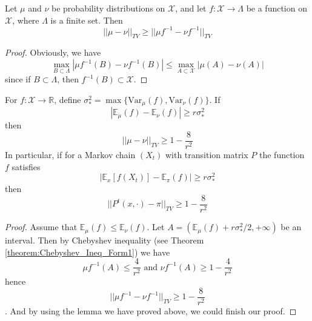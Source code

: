 \begin{lemma}
  Let $\mu$ and $\nu$ be probability distributions on $\mathcal{X}$, and let $f: \mathcal{X} \to \Lambda$ be a function on $\mathcal{X}$, where $\Lambda$ is a finite set. Then
  \[||\mu - \nu||_{TV} \geq ||\mu f^{-1} - \nu f^{-1}||_{TV}\]
\end{lemma}
\begin{proof}
  Obviously, we have
  \[\max_{B\subset\Lambda} |\mu f^{-1}(B) - \nu f^{-1}(B)| \leq \max_{A\subset\mathcal{X}} |\mu(A) - \nu(A)|\]
  since if $B\subset\Lambda$, then $f^{-1}(B)\subset\mathcal{X}$.
\end{proof}

\begin{theorem}
  For $f:\mathcal{X} \to \mathbb{R}$, define $\sigma_*^2 = \max\{\mathrm{Var}_\mu(f), \mathrm{Var}_\nu(f)\}$.
  If
  \[|\mathbb{E}_\mu(f) - \mathbb{E}_\nu(f)|\geq r\sigma_*^2\]
  then
  \[||\mu-\nu||_{TV}\geq 1 - \frac{8}{r^2}\]
  \tcblower
  In particular, if for a Markov chain $(X_t)$ with transition matrix $P$ the function $f$ satisfies
  \[|\mathbb{E}_x[f(X_t)] - \mathbb{E}_\pi(f)| \geq r\sigma_*^2\]
  then
  \[||P^t(x, \cdot) - \pi||_{TV}\geq 1-\frac{8}{r^2}\]
\end{theorem}
\begin{proof}
  Assume that $\mathbb{E}_\mu(f) \leq \mathbb{E}_\nu(f)$.
  Let $A = (\mathbb{E}_\mu(f) + r\sigma_*^2/2, +\infty)$ be an interval.
  Then by Chebyshev inequality (see Theorem \ref{theorem:Chebyshev_Ineq_Form1}) we have
  \[\mbox{$\mu f^{-1}(A) \leq \frac{4}{r^2}$ and $\nu f^{-1} (A) \geq 1 - \frac{4}{r^2}$}\]
  hence
  \[||\mu f^{-1} - \nu f^{-1}||_{TV} \geq 1 - \frac{8}{r^2}\].
  And by using the lemma we have proved above, we could finish our proof.
\end{proof}

